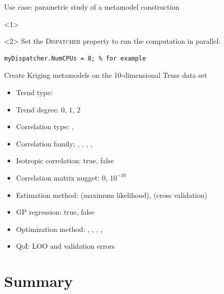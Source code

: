 \documentclass[]{rsuqbeamernew}
\begin{document}
\begin{frame}[fragile]{Use case: parametric study of a metamodel construction}

\begin{onlyenv}<1>
\end{onlyenv}
\begin{onlyenv}<2>
Set the \textsc{Dispatcher} property  to run the computation in parallel: 
\begin{lstlisting}[numbers=none]
myDispatcher.NumCPUs = 8; % for example
\end{lstlisting}
\end{onlyenv}
\begin{block}{Create Kriging metamodels on the 10-dimensional Truss data set}
\begin{itemize}
  \item Trend type: 
  \item Trend degree: $0$, $1$, $2$
  \item Correlation type: , 
  \item Correlation family; , ,
        , , 
  \item Isotropic correlation: true, false
  \item Correlation matrix nugget: $0$, $10^{-10}$
  \item Estimation method:  (maximum likelihood),
         (cross validation)
  \item GP regression: true, false
  \item Optimization method: , , , , 
  \item QoI: LOO and validation errors
\end{itemize}
\end{block}

\end{frame}


\section{Summary}
\end{document}

